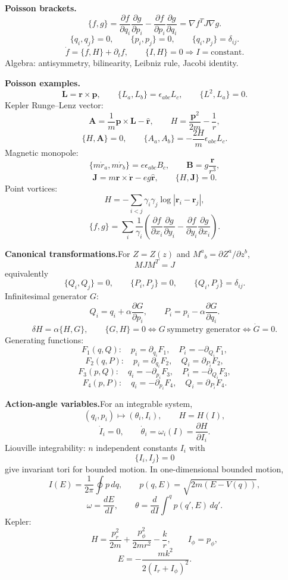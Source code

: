 \noindent\textbf{Poisson brackets.}\quad
\[
\boxed{\{f,g\}
=\frac{\partial f}{\partial q_i}\frac{\partial g}{\partial p_i}
-\frac{\partial f}{\partial p_i}\frac{\partial g}{\partial q_i}
=\nabla f^TJ\nabla g}.
\]
\[
\{q_i,q_j\}=0,\qquad \{p_i,p_j\}=0,\qquad \{q_i,p_j\}=\delta_{ij}.
\]
\[
\boxed{\dot f=\{f,H\}+\partial_tf},\qquad
\{I,H\}=0\Rightarrow I=\text{constant}.
\]
Algebra: antisymmetry, bilinearity, Leibniz rule, Jacobi identity.

\noindent\textbf{Poisson examples.}\quad
\[
\mathbf L=\mathbf r\times\mathbf p,\qquad
\{L_a,L_b\}=\epsilon_{abc}L_c,\qquad
\{L^2,L_a\}=0.
\]
Kepler Runge--Lenz vector:
\[
\mathbf A=\frac{1}{m}\mathbf p\times\mathbf L-\hat{\mathbf r},\qquad
H=\frac{\mathbf p^2}{2m}-\frac{1}{r},
\]
\[
\{H,\mathbf A\}=0,\qquad
\{A_a,A_b\}=-\frac{2H}{m}\epsilon_{abc}L_c.
\]
Magnetic monopole:
\[
\{m\dot r_a,m\dot r_b\}=e\epsilon_{abc}B_c,\qquad
\mathbf B=g\frac{\mathbf r}{r^3},
\]
\[
\mathbf J=m\mathbf r\times\dot{\mathbf r}-eg\hat{\mathbf r},\qquad
\{H,\mathbf J\}=0.
\]
Point vortices:
\[
H=-\sum_{i<j}\gamma_i\gamma_j\log|\mathbf r_i-\mathbf r_j|,
\]
\[
\{f,g\}=\sum_i\frac{1}{\gamma_i}
\left(
\frac{\partial f}{\partial x_i}\frac{\partial g}{\partial y_i}
-\frac{\partial f}{\partial y_i}\frac{\partial g}{\partial x_i}
\right).
\]

\noindent\textbf{Canonical transformations.}\quad For $Z=Z(z)$ and
$M^a{}_b=\partial Z^a/\partial z^b$,
\[
\boxed{MJM^T=J}
\]
equivalently
\[
\{Q_i,Q_j\}=0,\qquad \{P_i,P_j\}=0,\qquad \{Q_i,P_j\}=\delta_{ij}.
\]
Infinitesimal generator $G$:
\[
Q_i=q_i+\alpha\frac{\partial G}{\partial p_i},\qquad
P_i=p_i-\alpha\frac{\partial G}{\partial q_i}.
\]
\[
\delta H=\alpha\{H,G\},\qquad
\{G,H\}=0\Longleftrightarrow G\ \text{symmetry generator}
\Longleftrightarrow \dot G=0.
\]
Generating functions:
\[
F_1(q,Q):\quad p_i=\partial_{q_i}F_1,\quad P_i=-\partial_{Q_i}F_1,
\]
\[
F_2(q,P):\quad p_i=\partial_{q_i}F_2,\quad Q_i=\partial_{P_i}F_2,
\]
\[
F_3(p,Q):\quad q_i=-\partial_{p_i}F_3,\quad P_i=-\partial_{Q_i}F_3,
\]
\[
F_4(p,P):\quad q_i=-\partial_{p_i}F_4,\quad Q_i=\partial_{P_i}F_4.
\]

\noindent\textbf{Action-angle variables.}\quad For an integrable system,
\[
(q_i,p_i)\mapsto(\theta_i,I_i),\qquad H=H(I),
\]
\[
\dot I_i=0,\qquad
\dot\theta_i=\omega_i(I)=\frac{\partial H}{\partial I_i}.
\]
Liouville integrability: $n$ independent constants $I_i$ with
\[
\{I_i,I_j\}=0
\]
give invariant tori for bounded motion. In one-dimensional bounded motion,
\[
\boxed{I(E)=\frac{1}{2\pi}\oint p\,dq},\qquad
p(q,E)=\sqrt{2m(E-V(q))},
\]
\[
\omega=\frac{dE}{dI},\qquad
\theta=\frac{d}{dI}\int^q p(q',E)\,dq'.
\]
Kepler:
\[
H=\frac{p_r^2}{2m}+\frac{p_\phi^2}{2mr^2}-\frac{k}{r},\qquad
I_\phi=p_\phi,
\]
\[
\boxed{E=-\frac{mk^2}{2(I_r+I_\phi)^2}}.
\]

